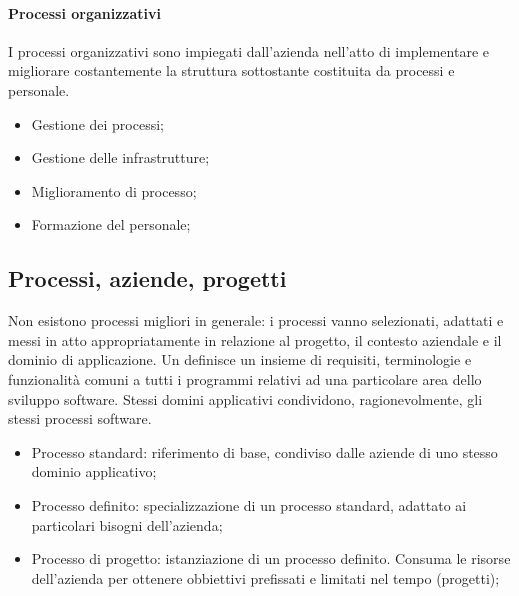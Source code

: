 \paragraph{Processi organizzativi}
I processi organizzativi sono impiegati dall'azienda nell'atto di implementare e migliorare costantemente la struttura sottostante costituita da processi e personale.

\begin{itemize}
	\item Gestione dei processi;
	\item Gestione delle infrastrutture;
	\item Miglioramento di processo;
	\item Formazione del personale;
\end{itemize}

\subsection{Processi, aziende, progetti}
Non esistono processi migliori in generale: i processi vanno selezionati, adattati e messi in atto appropriatamente in relazione al progetto, il contesto aziendale e il dominio di applicazione. Un  definisce un insieme di requisiti, terminologie e funzionalità comuni a tutti i programmi relativi ad una particolare area dello sviluppo software. Stessi domini applicativi condividono, ragionevolmente, gli stessi processi software.

\begin{itemize}
	\item Processo standard: riferimento di base, condiviso dalle aziende di uno stesso dominio applicativo;
	\item Processo definito: specializzazione di un processo standard, adattato ai particolari bisogni dell'azienda;
	\item Processo di progetto: istanziazione di un processo definito. Consuma le risorse dell'azienda per ottenere obbiettivi prefissati e limitati nel tempo (progetti);
\end{itemize}


